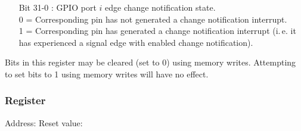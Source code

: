 \vspace{-2mm}
\begin{itemize}[leftmargin=18mm,labelsep=3mm,parsep=1.5mm]
    \item[\footnotesize Bit 31-0] : GPIO port $i$ edge change notification state.\\{\footnotesize
    0 = Corresponding pin has not generated a change notification interrupt.\\
    1 = Corresponding pin has generated a change notification interrupt (i.\,e. it has experienced a signal edge with enabled change notification).}
\end{itemize}
Bits in this register may be cleared (set to 0) using memory writes. Attempting to set bits to 1 using memory writes will have no effect.

\subsubsection{ Register}
\vspace{-3mm}
Address: \hfill
Reset value: \\[-1mm]
